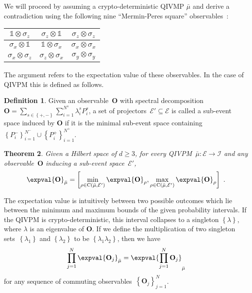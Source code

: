 \documentclass[english,reprint, aps, prl,superscriptaddress, showpacs,
showkeys, longbibliography, amsmath, amssymb]{revtex4-1}
\theoremstyle{plain}
\newtheorem{thm}{Theorem}
\theoremstyle{definition}
\newtheorem{definition}[thm]{Definition}
\newcommand{\events}{\ensuremath{\mathcal{E}}}
\newcommand{\coreBorn}{\ensuremath{\mathrm{C}}}
\begin{document}
We will proceed by assuming a crypto-deterministic QIVMP $\bar{\mu}$
and derive a contradiction using the following nine ``Mermin-Peres square''
observables~\cite{Mermin1990Simple,peres1995quantum}:
\begin{center}
\begin{tabular}{| c | c | c |}
\hline
$\mathbb{1} \otimes\sigma_{z}$ & $\sigma_{z}  \otimes\mathbb{1}$ & $\sigma_{z} \otimes\sigma_{z}$  \\ \hline
$\sigma_{x} \otimes\mathbb{1}$ & $\mathbb{1} \otimes\sigma_{x}$ & $\sigma_{x} \otimes\sigma_{x}$ \\ \hline
$\sigma_{x} \otimes\sigma_{z}$ & $\sigma_{z} \otimes\sigma_{x}$ & $\sigma_{y} \otimes\sigma_{y}$ \\ \hline
\end{tabular}
\label{eq:MerminSquare}
\end{center}


The argument refers to the expectation value of these
observables. In the case of QIVPM this is defined as follows. 

\begin{definition} Given an observable~$\mathbf{O}$ with spectral
  decomposition
  $\mathbf{O}=\sum_{s\in\left\{ +,-\right\}
  }\sum_{i=1}^{N^{s}}\lambda_{i}^{s}P_{i}^{s}$, a set of
  projectors~$\events'\subseteq\events$ is called a sub-event space
  induced by $\mathbf{O}$ if it is the minimal sub-event space
  containing
  $\left\{ P_{i}^{-}\right\} _{i=1}^{N^{-}}\cup\left\{
    P_{i}^{+}\right\} _{i=1}^{N^{+}}$.
\end{definition}

\begin{thm} Given a Hilbert space of $d\ge3$, for every
  QIVPM~$\bar{\mu}:\events\rightarrow\mathscr{I}$ and any
  observable~$\mathbf{O}$ inducing a sub-event space~$\events'$, 
\begin{equation}
\expval{\mathbf{O}}_{\bar{\mu}}=\left[\min_{\rho\in\coreBorn\left(\bar{\mu},\events'\right)}\expval{\mathbf{O}}_{\rho},\max_{\rho\in\coreBorn\left(\bar{\mu},\events'\right)}\expval{\mathbf{O}}_{\rho}\right]\textrm{ .}\label{eq:quantum-interval-expectation-core}
\end{equation}
\end{thm}

The expectation value is intuitively between two possible outcomes
which lie between the minimum and maximum bounds of the given
probability intervals. If the QIVPM is crypto-deterministic, this
interval collapses to a singleton $\left\{ \lambda\right\} $, where
$\lambda$ is an eigenvalue of $\mathbf{O}$. If we define the
multiplication of two singleton sets~$\left\{ \lambda_{1}\right\} $
and $\left\{ \lambda_{2}\right\} $ to be
$\left\{ \lambda_{1}\lambda_{2}\right\} $, then we have
\begin{equation}
\prod_{j=1}^{N}\expval{\mathbf{O}_{j}}_{\bar{\mu}}=\expval{\prod_{j=1}^{N}\mathbf{O}_{j}}_{\bar{\mu}}\label{eq:Kochen-Specker-Rules}
\end{equation}
for any sequence of commuting observables~$\left\{ \mathbf{O}_{j}\right\} _{j=1}^{N}$.
\end{document}
